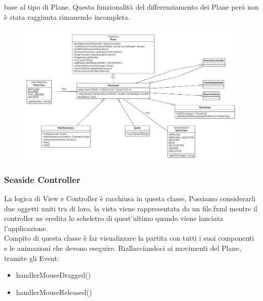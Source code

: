 \documentclass[a4paper,12pt]{report}
\begin{document}
base al tipo di Plane.
Questa funzionalità del differenziamento dei Plane però non è stata raggiunta rimanendo incompleta.
\begin{figure}[H]
    \begin{center}
        \centering
        \includegraphics[width=\textwidth]{img/Design/Rodilosso/Plane.png}
    \end{center}
    \label{img:planeuml}
\end{figure}

\subsubsection{Seaside Controller}
La logica di View e Controller è racchiusa in questa classe, 
Possiamo considerarli due oggetti uniti tra di loro, la vista viene rappresentata da un file.fxml mentre il controller ne eredita lo 
scheletro di quest’ultimo quando viene lanciata l’applicazione.
\\
Compito di questa classe è far visualizzare la partita con tutti i suoi componenti e le animazioni che devono eseguire.
Riallacciandoci ai movimenti del Plane, tramite gli Event:
\begin{itemize}
    \item handlerMouseDragged()
    \item handlerMouseReleased()
\end{itemize}
\end{document}
